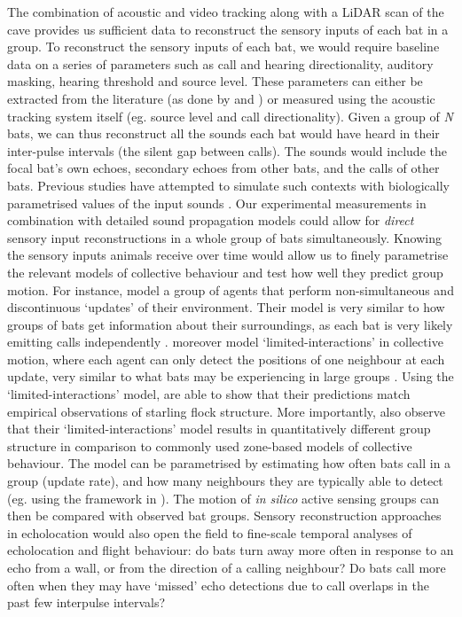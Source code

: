 \documentclass[
]{book}
\begin{document}
The combination of acoustic and video tracking along with a LiDAR scan of the cave provides us sufficient data to reconstruct the sensory inputs of each bat in a group. To reconstruct the sensory inputs of each bat, we would require baseline data on a series of parameters such as call and hearing directionality, auditory masking, hearing threshold and source level. These parameters can either be extracted from the literature (as done by \citet{beleyur2019modeling} and \citet{mazar2020sensorimotor}) or measured using the acoustic tracking system itself (eg. source level and call directionality). Given a group of \emph{N} bats, we can thus reconstruct all the sounds each bat would have heard in their inter-pulse intervals (the silent gap between calls). The sounds would include the focal bat's own echoes, secondary echoes from other bats, and the calls of other bats. Previous studies have attempted to simulate such contexts with biologically parametrised values of the input sounds \citep{beleyur2019modeling, mazar2020sensorimotor}. Our experimental measurements in combination with detailed sound propagation models could allow for \emph{direct} sensory input reconstructions in a whole group of bats simultaneously. Knowing the sensory inputs animals receive over time would allow us to finely parametrise the relevant models of collective behaviour and test how well they predict group motion. For instance, \citet{bode2011a} model a group of agents that perform non-simultaneous and discontinuous `updates' of their environment. Their model is very similar to how groups of bats get information about their surroundings, as each bat is very likely emitting calls independently \citep{hase2018a}. \citet{bode2011a} moreover model `limited-interactions' in collective motion, where each agent can only detect the positions of one neighbour at each update, very similar to what bats may be experiencing in large groups \citep{beleyur2019modeling}. Using the `limited-interactions' model, \citet{bode2011a} are able to show that their predictions match empirical observations of starling flock structure. More importantly, \citet{bode2011a} also observe that their `limited-interactions' model results in quantitatively different group structure in comparison to commonly used zone-based models \citep[eg.][]{couzin2002a} of collective behaviour. The \citet{bode2011a} model can be parametrised by estimating how often bats call in a group (update rate), and how many neighbours they are typically able to detect (eg. using the framework in \citet{beleyur2019modeling}). The motion of \emph{in silico} active sensing groups can then be compared with observed bat groups. Sensory reconstruction approaches in echolocation would also open the field to fine-scale temporal analyses of echolocation and flight behaviour: do bats turn away more often in response to an echo from a wall, or from the direction of a calling neighbour? Do bats call more often when they may have `missed' echo detections due to call overlaps in the past few interpulse intervals?
\end{document}
